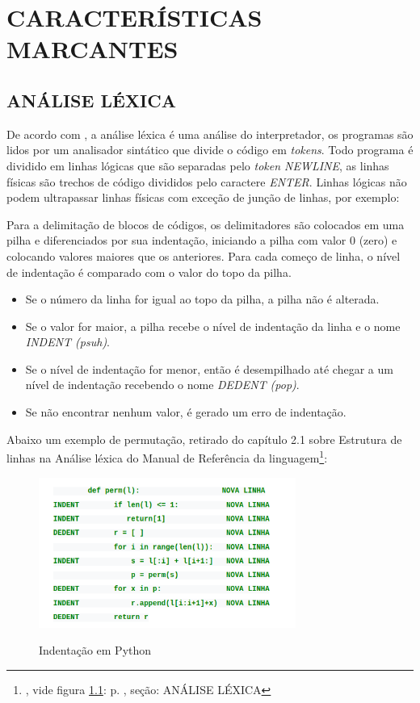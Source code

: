 
\chapter{CARACTERÍSTICAS MARCANTES}
\section{ANÁLISE LÉXICA}
De acordo com , a análise léxica é uma análise do interpretador, os programas são lidos por um analisador sintático que divide o código em \textit{tokens}.
Todo programa é dividido em linhas lógicas que são separadas pelo \textit{token NEWLINE}, as linhas físicas são trechos de código divididos pelo caractere \textit{ENTER}.
Linhas lógicas não podem ultrapassar linhas físicas com exceção de junção de linhas, por exemplo:



Para a delimitação de blocos de códigos, os delimitadores são colocados em uma pilha e diferenciados por sua indentação, iniciando a pilha com valor 0 (zero) e colocando valores maiores que os anteriores.
Para cada começo de linha, o nível de indentação é comparado com o valor do topo da pilha.
\begin{itemize}
    \item Se o número da linha for igual ao topo da pilha, a pilha não é alterada.
    \item Se o valor for maior, a pilha recebe o nível de indentação da linha e o nome \textit{INDENT (psuh)}.
    \item Se o nível de indentação for menor, então é desempilhado até chegar a um nível de indentação recebendo o nome \textit{DEDENT (pop)}.
    \item Se não encontrar nenhum valor, é gerado um erro de indentação.
\end{itemize}
\par Abaixo um exemplo de permutação, retirado do capítulo 2.1 sobre Estrutura de linhas na Análise léxica do Manual de Referência da linguagem\footnote{
    , vide figura \ref{fig:figura-ident-python}: p. \pageref{fig:figura-ident-python}, seção: ANÁLISE LÉXICA
}:

\begin{figure}[!htb]
    \centering
    \caption{Indentação em Python}
    \includegraphics[width=0.75\textwidth]{./dados/figuras/ident1.png}
    \label{fig:figura-ident-python}
\end{figure}

